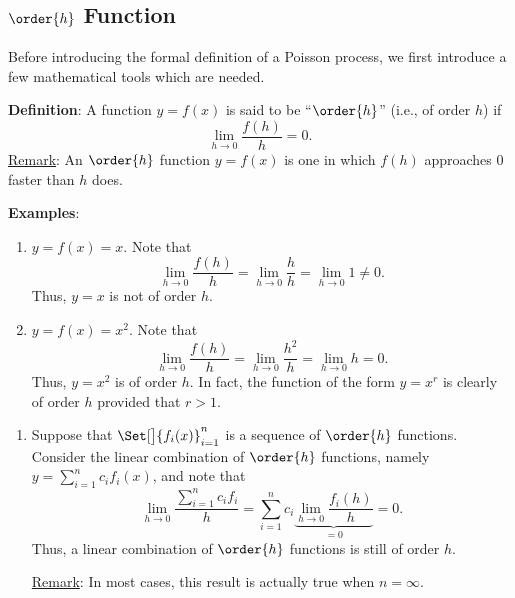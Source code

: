 \subsection*{$\order{h}$ Function}
Before introducing the formal definition of a Poisson process, we first introduce a few mathematical tools which are needed.
\begin{Regular}
    \textbf{Definition}: A function $ y=f(x) $ is said to be ``$ \order{h} $'' (i.e., of order $ h $) if
    \[ \lim\limits_{{h} \to {0}}\frac{f(h)}{h}=0. \]
    \tcblower{}
    \underline{Remark}: An $ \order{h} $ function $ y=f(x) $ is one in which $ f(h) $ approaches $ 0 $ faster than $ h $ does.
\end{Regular}
\begin{Example}
    \textbf{Examples}:
    \begin{enumerate}[(1)]
        \item $ y=f(x)=x $. Note that
              \[ \lim\limits_{{h} \to {0}}\frac{f(h)}{h}=\lim\limits_{{h} \to {0}}\frac{h}{h}=\lim\limits_{{h} \to {0}}1\ne 0. \]
              Thus, $ y=x $ is not of order $ h $.
        \item $ y=f(x)=x^2 $. Note that
              \[ \lim\limits_{{h} \to {0}}\frac{f(h)}{h}=\lim\limits_{{h} \to {0}}\frac{h^2}{h}=\lim\limits_{{h} \to {0}}h=0. \]
              Thus, $ y=x^2 $ is of order $ h $. In fact, the function of the form $ y=x^r $ is clearly of order $ h $ provided that $ r>1 $.
    \end{enumerate}
\end{Example}
\begin{enumerate}[(3)]
    \item Suppose that $ \Set[\big]{f_i(x)}_{i=1}^n $ is a sequence of $ \order{h} $ functions. Consider the linear combination of $ \order{h} $
          functions, namely $ y=\sum_{i=1}^{n}c_i f_i(x) $, and note that
          \[ \lim\limits_{{h} \to {0}}\frac{\sum_{i=1}^{n}c_i f_i}{h}=\sum_{i=1}^{n}c_i \underbrace{\lim\limits_{{h} \to {0}}\frac{f_i(h)}{h}}_{=0}=0. \]
          Thus, a linear combination of $ \order{h} $ functions is still of order $ h $.

          \underline{Remark}: In most cases, this result is actually true when $ n=\infty $.
\end{enumerate}
